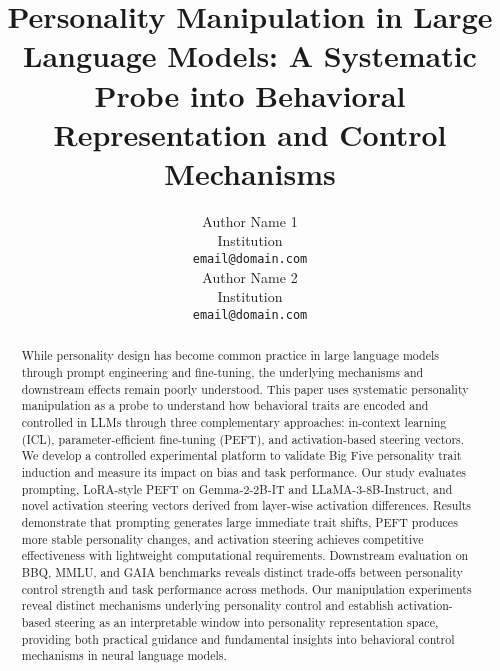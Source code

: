 \documentclass[11pt]{article}
\title{Personality Manipulation in Large Language Models: A Systematic Probe into Behavioral Representation and Control Mechanisms}
\author{Author Name 1 \\
  Institution \\
  \texttt{email@domain.com} \\\And
  Author Name 2 \\
  Institution \\
  \texttt{email@domain.com} \\}
\begin{document}
\maketitle
\begin{abstract}
While personality design has become common practice in large language models through prompt engineering and fine-tuning, the underlying mechanisms and downstream effects remain poorly understood. This paper uses systematic personality manipulation as a probe to understand how behavioral traits are encoded and controlled in LLMs through three complementary approaches: in-context learning (ICL), parameter-efficient fine-tuning (PEFT), and activation-based steering vectors. We develop a controlled experimental platform to validate Big Five personality trait induction and measure its impact on bias and task performance. Our study evaluates prompting, LoRA-style PEFT on Gemma-2-2B-IT and LLaMA-3-8B-Instruct, and novel activation steering vectors derived from layer-wise activation differences. Results demonstrate that prompting generates large immediate trait shifts, PEFT produces more stable personality changes, and activation steering achieves competitive effectiveness with lightweight computational requirements. Downstream evaluation on BBQ, MMLU, and GAIA benchmarks reveals distinct trade-offs between personality control strength and task performance across methods. Our manipulation experiments reveal distinct mechanisms underlying personality control and establish activation-based steering as an interpretable window into personality representation space, providing both practical guidance and fundamental insights into behavioral control mechanisms in neural language models.
\end{abstract}






\appendix













\end{document}
